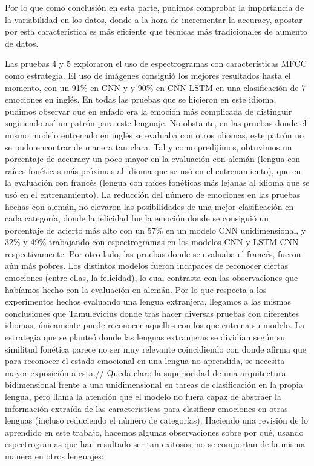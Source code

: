 \documentclass[11pt,a4paper,spanish]{book}
\begin{document}
	Por lo que como conclusión en esta parte, pudimos comprobar la importancia de la variabilidad en los datos, donde a la hora de incrementar la accuracy, apostar por esta característica es más eficiente que técnicas más tradicionales de aumento de datos.
	
	Las pruebas 4 y 5 exploraron el uso de espectrogramas con características MFCC como estrategia. El uso de imágenes consiguió los mejores resultados hasta el momento, con un 91\% en CNN y y 90\% en CNN-LSTM en una clasificación de 7 emociones en inglés. 
	En todas las pruebas que se hicieron en este idioma, pudimos observar que en enfado era la emoción más complicada de distinguir sugiriendo así un patrón para este lenguaje.
	No obstante, en las pruebas donde el mismo modelo entrenado en inglés se evaluaba con otros idiomas, este patrón no se pudo encontrar de manera tan clara.
	Tal y como predijimos, obtuvimos un porcentaje de accuracy un poco mayor en la evaluación con alemán (lengua con raíces fonéticas más próximas al idioma que se usó en el entrenamiento), que en la evaluación con francés (lengua con raíces fonéticas más lejanas al idioma que se usó en el entrenamiento). La reducción del número de emociones en las pruebas hechas con alemán, no elevaron las posibilidades de una mejor clasificación en cada categoría, donde la felicidad fue la emoción donde se consiguió un porcentaje de acierto más alto con un 57\% en un modelo CNN unidimensional, y 32\% y 49\% trabajando con espectrogramas en los modelos CNN y LSTM-CNN respectivamente.
	Por otro lado, las pruebas donde se evaluaba el francés, fueron aún más pobres. Los distintos modelos fueron incapaces de reconocer ciertas emociones (entre ellas, la felicidad), lo cual contrasta con las observaciones que habíamos hecho con la evaluación en alemán.
	Por lo que respecta a los experimentos hechos evaluando una lengua extranjera, llegamos a las mismas conclusiones que Tamulevicius \cite{Tamulevicius2020} donde tras hacer diversas pruebas con diferentes idiomas, únicamente puede reconocer aquellos con los que entrena su modelo. 
	La estrategia que se planteó donde las lenguas extranjeras se dividían según su similitud fonética parece no ser muy relevante coincidiendo con \cite{Pell2008} donde afirma que para reconocer el estado emocional en una lengua no aprendida, se necesita mayor exposición a esta.//
	Queda claro la superioridad de una arquitectura bidimensional frente a una unidimensional en tareas de clasificación en la propia lengua, pero llama la atención que el modelo no fuera capaz de abstraer la información extraída de las características para clasificar emociones en otras lenguas (incluso reduciendo el número de categorías). Haciendo una revisión de lo aprendido en este trabajo, hacemos algunas observaciones sobre por qué, usando espectrogramas que han resultado ser tan exitosos, no se comportan de la misma manera en otros lenguajes:
	
\end{document}
